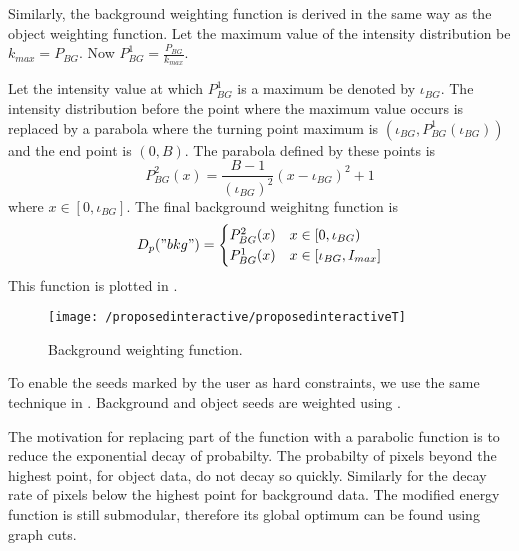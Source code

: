 \begin{definition} 
	Similarly, the background weighting function is derived in the same way as the object weighting function. Let the maximum value of the intensity distribution be $k_{max} = P_{BG}$. Now $P_{BG}^{1} = \frac{P_{BG}}{k_{max}}$.
	
	Let the intensity value at which $P_{BG}^{1}$ is a maximum be denoted by $\iota_{BG}$. The intensity distribution before the point where the maximum value occurs is replaced by a parabola where the turning point maximum is $\left(\iota_{BG}, P_{BG}^{1}(\iota_{BG})\right)$ and the end point is $(0,B)$. The parabola defined by these points is 
	\begin{equation}
	P_{BG}^2(x) = \frac{B-1}{(\iota_{BG})^2}(x-\iota_{BG})^2 +1 
	\end{equation}
	where $x \in [0,\iota_{BG}]$.
	The final background weighitng function is
	\begin{equation}
	D_p("bkg") = \begin{cases} 
	P_{BG}^2(x) & x \in [0,\iota_{BG}) \\
	P_{BG}^1(x) & x \in [\iota_{BG},I_{max}]
	\end{cases}
	\end{equation}
	This function is plotted in .
	
	\begin{figure}[!h]
		\centering
		\texttt{[image: /proposedinteractive/proposedinteractiveT]}
		\caption{Background weighting function.}
		\label{fig:proposedinteractiveT}
	\end{figure}
\end{definition}

\begin{definition}
	To enable the seeds marked by the user as hard constraints, we use the same technique in \citep{Boykov2001_2}. Background and object seeds are weighted using .
\end{definition}

The motivation for replacing part of the function with a parabolic function is to reduce the exponential decay of probabilty. The probabilty of pixels beyond the highest point, for object data, do not decay so quickly. Similarly for the decay rate of pixels below the highest point for background data. The modified energy function is still submodular, therefore its global optimum can be found using graph cuts.


